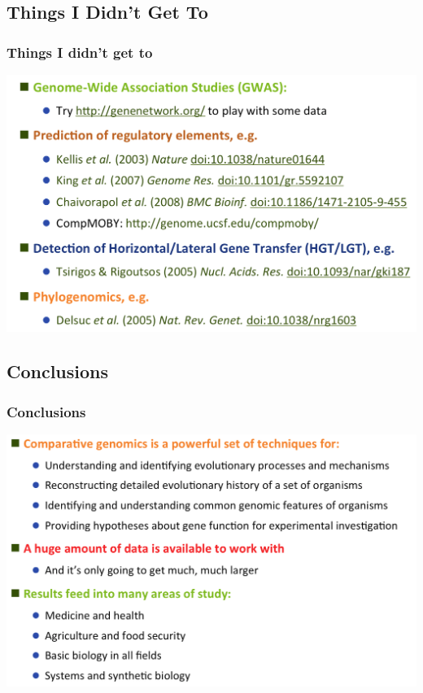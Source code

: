 
\subsection{Things I Didn't Get To}

\begin{frame}
  \frametitle{Things I didn't get to}
  \begin{center}
      \includegraphics[width=1\textwidth]{images/didnt_get_to} 
  \end{center}
\end{frame}

\subsection{Conclusions}

\begin{frame}
  \frametitle{Conclusions}
  \begin{center}
      \includegraphics[width=1\textwidth]{images/conclusions1} 
  \end{center}
\end{frame}

